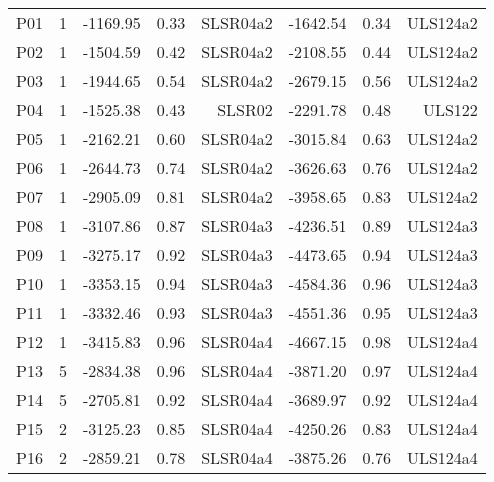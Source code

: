 
\tablelasttail{\hline 
}

\begin{center}
\begin{supertabular}{|c|c|rrr|rrr|}
P01 & 1 & -1169.95 & 0.33 & SLSR04a2 & -1642.54 & 0.34 & ULS124a2\\
P02 & 1 & -1504.59 & 0.42 & SLSR04a2 & -2108.55 & 0.44 & ULS124a2\\
P03 & 1 & -1944.65 & 0.54 & SLSR04a2 & -2679.15 & 0.56 & ULS124a2\\
P04 & 1 & -1525.38 & 0.43 & SLSR02 & -2291.78 & 0.48 & ULS122\\
P05 & 1 & -2162.21 & 0.60 & SLSR04a2 & -3015.84 & 0.63 & ULS124a2\\
P06 & 1 & -2644.73 & 0.74 & SLSR04a2 & -3626.63 & 0.76 & ULS124a2\\
P07 & 1 & -2905.09 & 0.81 & SLSR04a2 & -3958.65 & 0.83 & ULS124a2\\
P08 & 1 & -3107.86 & 0.87 & SLSR04a3 & -4236.51 & 0.89 & ULS124a3\\
P09 & 1 & -3275.17 & 0.92 & SLSR04a3 & -4473.65 & 0.94 & ULS124a3\\
P10 & 1 & -3353.15 & 0.94 & SLSR04a3 & -4584.36 & 0.96 & ULS124a3\\
P11 & 1 & -3332.46 & 0.93 & SLSR04a3 & -4551.36 & 0.95 & ULS124a3\\
P12 & 1 & -3415.83 & 0.96 & SLSR04a4 & -4667.15 & 0.98 & ULS124a4\\
P13 & 5 & -2834.38 & 0.96 & SLSR04a4 & -3871.20 & 0.97 & ULS124a4\\
P14 & 5 & -2705.81 & 0.92 & SLSR04a4 & -3689.97 & 0.92 & ULS124a4\\
P15 & 2 & -3125.23 & 0.85 & SLSR04a4 & -4250.26 & 0.83 & ULS124a4\\
P16 & 2 & -2859.21 & 0.78 & SLSR04a4 & -3875.26 & 0.76 & ULS124a4\\

\end{supertabular}
\end{center}
